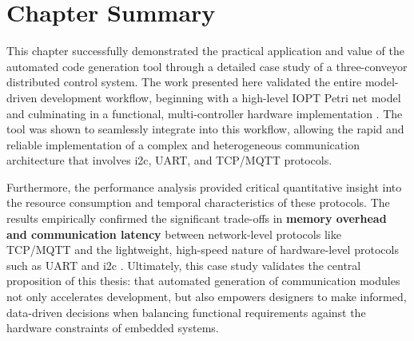 \section{Chapter Summary}
\label{sec:case_study_summary}

This chapter successfully demonstrated the practical application and value of the automated code generation tool through a detailed case study of a three-conveyor distributed control system. The work presented here validated the entire model-driven development workflow, beginning with a high-level IOPT Petri net model and culminating in a functional, multi-controller hardware implementation . The tool was shown to seamlessly integrate into this workflow, allowing the rapid and reliable implementation of a complex and heterogeneous communication architecture that involves \gls{i2c}, UART, and TCP/MQTT protocols.

Furthermore, the performance analysis provided critical quantitative insight into the resource consumption and temporal characteristics of these protocols. The results empirically confirmed the significant trade-offs in \textbf{memory overhead and communication latency} between network-level protocols like TCP/MQTT and the lightweight, high-speed nature of hardware-level protocols such as UART and \gls{i2c} . Ultimately, this case study validates the central proposition of this thesis: that automated generation of communication modules not only accelerates development, but also empowers designers to make informed, data-driven decisions when balancing functional requirements against the hardware constraints of embedded systems.
